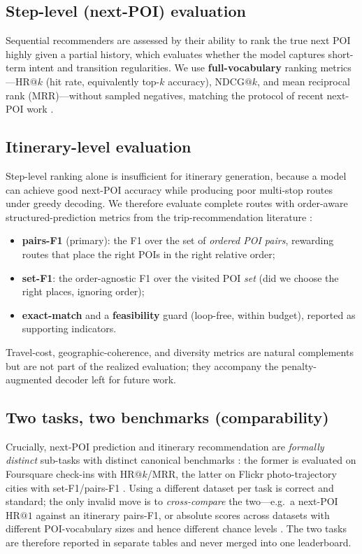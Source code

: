 \subsection{Step-level (next-POI) evaluation}
Sequential recommenders are assessed by their ability to rank the true next POI highly given a partial history, which evaluates whether the model captures short-term intent and transition regularities. We use \textbf{full-vocabulary} ranking metrics---$\mathrm{HR@}k$ (hit rate, equivalently top-$k$ accuracy), $\mathrm{NDCG@}k$, and mean reciprocal rank ($\mathrm{MRR}$)---without sampled negatives, matching the protocol of recent next-POI work \citep{yang2022getnext, li2024llm4poi}.

\subsection{Itinerary-level evaluation}
Step-level ranking alone is insufficient for itinerary generation, because a model can achieve good next-POI accuracy while producing poor multi-stop routes under greedy decoding. We therefore evaluate complete routes with order-aware structured-prediction metrics from the trip-recommendation literature \citep{chen2016learning}:

\begin{itemize}[leftmargin=*]
    \item \textbf{pairs-F1} (primary): the F1 over the set of \emph{ordered POI pairs}, rewarding routes that place the right POIs in the right relative order;
    \item \textbf{set-F1}: the order-agnostic F1 over the visited POI \emph{set} (did we choose the right places, ignoring order);
    \item \textbf{exact-match} and a \textbf{feasibility} guard (loop-free, within budget), reported as supporting indicators.
\end{itemize}
Travel-cost, geographic-coherence, and diversity metrics are natural complements but are not part of the realized evaluation; they accompany the penalty-augmented decoder left for future work.

\subsection{Two tasks, two benchmarks (comparability)}
Crucially, next-POI prediction and itinerary recommendation are \emph{formally distinct} sub-tasks with distinct canonical benchmarks \citep{lim2018survey, halder2024survey}: the former is evaluated on Foursquare check-ins with $\mathrm{HR@}k$/$\mathrm{MRR}$, the latter on Flickr photo-trajectory cities with set-F1/pairs-F1 \citep{chen2016learning}. Using a different dataset per task is correct and standard; the only invalid move is to \emph{cross-compare} the two---e.g.\ a next-POI $\mathrm{HR@}1$ against an itinerary pairs-F1, or absolute scores across datasets with different POI-vocabulary sizes and hence different chance levels \citep{krichene2020sampled}. The two tasks are therefore reported in separate tables and never merged into one leaderboard.

